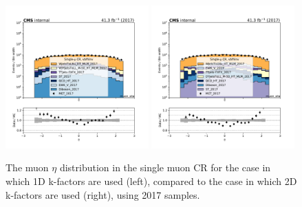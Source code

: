 \begin{figure}
    \begin{center}
        \includegraphics[width=0.49\textwidth]{fig/datamc_1dkfac/cr_1m_vbf/cr_1m_vbf_muon_eta_losf_2017.pdf}
        \includegraphics[width=0.49\textwidth]{fig/datamc/cr_1m_vbf/cr_1m_vbf_muon_eta_losf_2017.pdf} 
        \caption{The muon $\eta$ distribution in the single muon CR for the case in which 1D k-factors are used (left), 
        compared to the case in which 2D k-factors are used (right), using 2017 samples.}
        \label{fig:muon_eta_2017}
    \end{center}
\end{figure}

